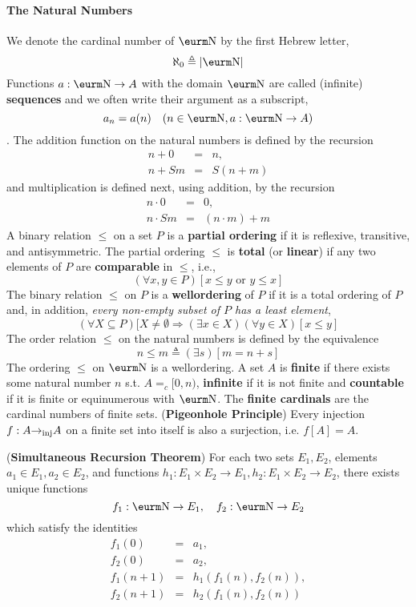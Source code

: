 \documentclass{myproc}
\begin{document}
\paragraph{The Natural Numbers}
\bit
\w We denote the {\bb{}cardinal number of $\N$\/} by the first
	Hebrew letter,
		\[ \aleph_0 \triangleq |{\N}| \]
\w Functions $a: {\N} \rightarrow A$ with the domain $\N$ are
	called (infinite) {\bf{}sequences} and we often write their
	argument as a subscript,
		\[ a_n = a(n) \quad (n \in {\N}, a: {\N} \rightarrow A)\]
. The addition function on
	the natural numbers is defined by the recursion
		\begin{eqnarray*}
		n + 0 & = & n,\\
		n + Sm & = & S(n + m)
		\end{eqnarray*}
	and multiplication is defined next, using addition, by the recursion
		\begin{eqnarray*}
		n \cdot 0 & = & 0, \\
		n \cdot Sm & = & (n\cdot{}m) + m
		\end{eqnarray*}
\w A binary relation $\le$ on a set $P$ is a {\bf{}partial ordering}
	if it is reflexive, transitive, and antisymmetric.
\w The partial ordering $\le$ is {\bf{}total} (or {\bf{}linear})
	if any two elements of $P$ are {\bf{}comparable} in $\le$, i.e.,
		\[ (\forall{}x, y \in P)[x \le y \mbox{\ or\ } y \le x] \]
\w The binary relation $\le$ on $P$ is a {\bf{}wellordering} of $P$
	if it is a total ordering of $P$ and, in addition, {\em{}every
	non-empty subset of $P$ has a least element\/},
	\[ (\forall{X}\subseteq P)[X \ne \emptyset \Rightarrow
		(\exists{x \in X})(\forall{y \in X})[x \le y] \]
		\bit
		\w The order relation $\le$ on the natural numbers is 
			defined by the equivalence
			\[ n \le m \triangleq (\exists{s})[m = n + s] \]
		\w The ordering $\le$ on $\N$ is a wellordering.
		\eit
\w A set $A$ is {\bf{}finite} if there exists some natural
	number $n$ s.t. $A =_c [0, n)$, {\bf{}infinite} if it is not
	finite and {\bf{}countable} if it is finite or equinumerous
	with $\N$. The {\bf{}finite cardinals} are the cardinal
	numbers of finite sets.
\w ({\bf{}Pigeonhole Principle}) Every injection $f: A \mbox{$\rightarrow$}_{\mbox{\scriptsize{}inj}} A$
	on a finite set into itself is also a surjection, i.e.
	$f[A] = A$.

\w ({\bf{}Simultaneous Recursion Theorem}) For each two sets
	$E_1, E_2$, elements $a_1 \in E_1, a_2 \in E_2$, and functions
	$h_1: E_1\times{E_2} \rightarrow E_1, h_2: 
		E_1\times{E_2} \rightarrow E_2$,
	there exists unique functions
		\[f_1: {\N} \rightarrow E_1, \quad f_2: {\N} \rightarrow E_2 \]
	which satisfy the identities
		\begin{eqnarray*}
		f_1(0) & = & a_1,\\
		f_2(0) & = & a_2,\\
		f_1(n+1) & = & h_1(f_1(n), f_2(n)),\\
		f_2(n+1) & = & h_2(f_1(n), f_2(n)) 
		\end{eqnarray*}
\eit
\end{document}
